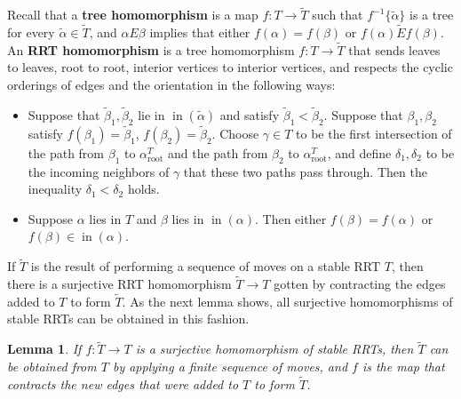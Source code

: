 \documentclass[11pt]{amsart}
\newtheorem{lemma}[theorem]{Lemma}
\theoremstyle{definition}
\theoremstyle{remark}
\theoremstyle{plain}
\newcommand{\on}{\operatorname}
\newcommand{\incom}{\on{in}}
\renewcommand{\root}{{\on{root}}}
\newcommand{\wt}{\widetilde}
\begin{document}
Recall that a \textbf{tree homomorphism} is a map $f\colon T \to \wt T$ such that $f^{-1}\{\wt\alpha\}$ is a tree for every $\wt\alpha \in \wt T$, and $\alpha E\beta$ implies that either $f(\alpha)=f(\beta)$ or $	f(\alpha)\wt Ef(\beta)$.
An \textbf{RRT homomorphism} is a tree homomorphism $f\colon T \to \wt T$ that sends leaves to leaves, root to root, interior vertices to interior vertices, and respects the cyclic orderings of edges and the orientation in
the following ways:
\begin{itemize}
\item Suppose that $\wt\beta_1, \wt\beta_2$ lie in $\incom(\wt\alpha)$ and satisfy $\wt\beta_1 < \wt\beta_2$.
Suppose that $\beta_1, \beta_2$ satisfy $f(\beta_1) = \wt\beta_1$, $f(\beta_2) = \wt\beta_2$.
Choose $\gamma \in T$ to be the first intersection of the path from $\beta_1$ to $\alpha_\root^T$ and the path from $\beta_2$ to $\alpha_\root^T$, and define $\delta_1, \delta_2$ to be the incoming neighbors of $\gamma$ that these two paths pass through.
Then the inequality $\delta_1 < \delta_2$ holds.

\item Suppose $\alpha$ lies in $T$ and $\beta$ lies in $\incom(\alpha)$.
Then either $f(\beta) = f(\alpha)$ or $f(\beta) \in \incom(\alpha)$.
\end{itemize}
If $\wt T$ is the result of performing a sequence of moves on a stable RRT $T$, then there is a surjective RRT homomorphism $\wt T \to T$ gotten by contracting the edges added to $T$ to form $\wt T$.
As the next lemma shows, all surjective homomorphisms of stable RRTs can be obtained in this fashion.

\begin{lemma}
\label{lem:RRT_ll}
If $f\colon \wt T \to T$ is a surjective homomorphism of stable RRTs, then $\wt T$ can be obtained from $T$ by applying a finite sequence of moves, and $f$ is the map that contracts the new edges that were added to $T$ to form $\wt T$.
\end{lemma}
\end{document}
